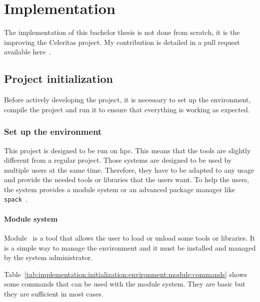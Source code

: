 \chapter{Implementation}
\label{ch:implementation}

The implementation of this bachelor thesis is not done from scratch, it is the
improving the Celeritas project.
My contribution is detailed in a pull request available here~\cite{pull-request-barras}.


\section{Project initialization}
\label{ch:implementation:initialization}

Before actively developing the project, it is necessary to set up the
environment, compile the project and run it to ensure that everything is
working as expected.

\subsection{Set up the environment}
\label{ch:implementation:initialization:environment}

This project is designed to be run on \acrshort{hpc}.
This means that the tools are slightly different from a regular project.
Those systems are designed to be used by multiple users at the same time.
Therefore, they have to be adapted to any usage and provide the needed tools
or libraries that the users want.
To help the users, the system provides a module system or an advanced package
manager like \texttt{spack}~\cite{Spack}.


\subsubsection{Module system}
\label{ch:implementation:initialization:environment:module}

Module~\cite{Module} is a tool that allows the user to load or unload some tools
or libraries.
It is a simple way to manage the environment and it must be installed and
managed by the system administrator.

Table~\ref{tab:implementation:initialization:environment:module:commands} shows
some commands that can be used with the module system.
They are basic but they are sufficient in most cases.


